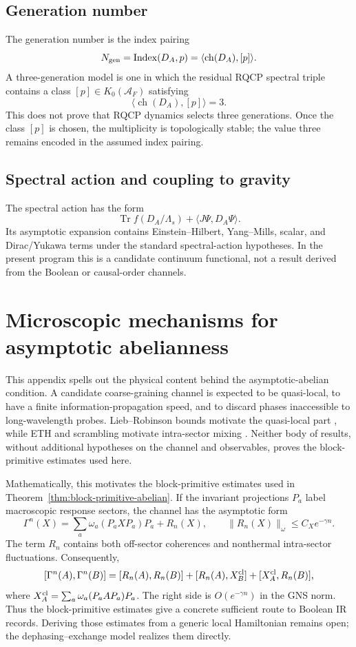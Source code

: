 \documentclass[11pt]{article}
\newcommand{\A}{\mathcal A}
\newcommand{\Index}{\operatorname{Index}}
\newcommand{\ch}{\operatorname{ch}}
\begin{document}
\subsection*{Generation number}

The generation number is the index pairing
\[
N_{\rm gen}=\Index(D_A,p)=\langle \ch(D_A),[p]\rangle.
\]
A three-generation model is one in which the residual RQCP spectral triple contains a class $[p]\in K_0(\A_F)$ satisfying
\[
\langle \ch(D_A),[p]\rangle=3.
\]
This does not prove that RQCP dynamics selects three generations.  Once the
class \([p]\) is chosen, the multiplicity is topologically stable; the value
three remains encoded in the assumed index pairing.

\subsection*{Spectral action and coupling to gravity}

The spectral action has the form
\[
\operatorname{Tr} f(D_A/\Lambda_s)+\langle J\Psi,D_A\Psi\rangle.
\]
Its asymptotic expansion contains Einstein--Hilbert, Yang--Mills, scalar, and
Dirac/Yukawa terms under the standard spectral-action hypotheses.  In the
present program this is a candidate continuum functional, not a result
derived from the Boolean or causal-order channels.


\section{Microscopic mechanisms for asymptotic abelianness}\label{app:v62-asymptotic-origin}

This appendix spells out the physical content behind the
asymptotic-abelian condition.  A candidate coarse-graining channel is
expected to be quasi-local, to have a finite information-propagation speed,
and to discard phases inaccessible to long-wavelength probes.
Lieb--Robinson bounds motivate the quasi-local part
\cite{LiebRobinson1972}, while ETH and scrambling motivate intra-sector
mixing \cite{Deutsch1991,Srednicki1994}.  Neither body of results, without
additional hypotheses on the channel and observables, proves the
block-primitive estimates used here.

Mathematically, this motivates the block-primitive estimates used in Theorem~\ref{thm:block-primitive-abelian}.  If the invariant projections $P_a$ label macroscopic response sectors, the channel has the asymptotic form
\[
\Gamma^n(X)=\sum_a \omega_a(P_aXP_a)P_a+R_n(X),
\qquad
\|R_n(X)\|_\omega\le C_Xe^{-\gamma n}.
\]
The term $R_n$ contains both off-sector coherences and nonthermal intra-sector fluctuations.  Consequently,
\[
[\Gamma^n(A),\Gamma^n(B)]=[R_n(A),R_n(B)]+[R_n(A),X_B^{\rm cl}]+[X_A^{\rm cl},R_n(B)],
\]
where $X_A^{\rm cl}=\sum_a\omega_a(P_aAP_a)P_a$.  The right side is
$O(e^{-\gamma n})$ in the GNS norm.  Thus the block-primitive estimates give
a concrete sufficient route to Boolean IR records.  Deriving those estimates
from a generic local Hamiltonian remains open; the dephasing--exchange model
realizes them directly.
\end{document}
